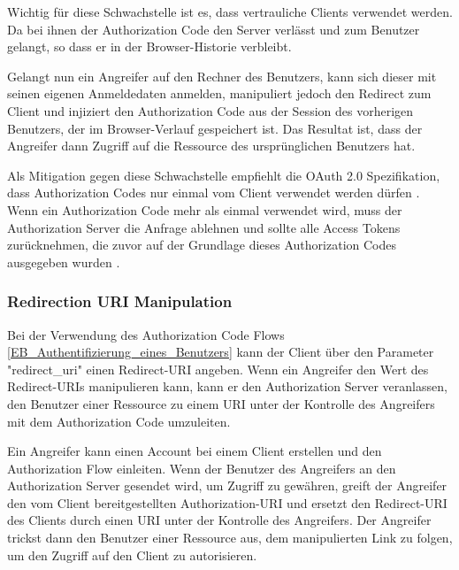 
Wichtig für diese Schwachstelle ist es, dass vertrauliche Clients verwendet werden. Da bei ihnen der Authorization Code den Server verlässt und zum Benutzer gelangt, so dass er in der Browser-Historie verbleibt.

Gelangt nun ein Angreifer auf den Rechner des Benutzers, kann sich dieser mit seinen eigenen Anmeldedaten anmelden, manipuliert jedoch den Redirect zum Client und injiziert den Authorization Code aus der Session des vorherigen Benutzers, der im Browser-Verlauf gespeichert ist. Das Resultat ist, dass der Angreifer dann Zugriff auf die Ressource des ursprünglichen Benutzers hat.

Als Mitigation gegen diese Schwachstelle empfiehlt die OAuth 2.0 Spezifikation, dass Authorization Codes nur einmal vom Client verwendet werden dürfen \cite{OAuthAuthorizationResponse}. Wenn ein Authorization Code mehr als einmal verwendet wird, muss der Authorization Server die Anfrage ablehnen und sollte alle Access Tokens zurücknehmen, die zuvor auf der Grundlage dieses Authorization Codes ausgegeben wurden \cite{OAuthAuthorizationResponse}.

\subsubsection{Redirection URI Manipulation}

Bei der Verwendung des Authorization Code Flows \ref{EB_Authentifizierung_eines_Benutzers} kann der Client über den Parameter "redirect\_uri" einen Redirect-URI angeben. Wenn ein Angreifer den Wert des Redirect-URIs manipulieren kann, kann er den Authorization Server veranlassen, den Benutzer einer Ressource zu einem URI unter der Kontrolle des Angreifers mit dem Authorization Code umzuleiten. \cite{OAuthAuthorizationSecurityConsiderations}

Ein Angreifer kann einen Account bei einem Client erstellen und den Authorization Flow einleiten. Wenn der Benutzer des Angreifers an den Authorization Server gesendet wird, um Zugriff zu gewähren, greift der Angreifer den vom Client bereitgestellten Authorization-URI und ersetzt den Redirect-URI des Clients durch einen URI unter der Kontrolle des Angreifers. Der Angreifer trickst dann den Benutzer einer Ressource aus, dem manipulierten Link zu folgen, um den Zugriff auf den Client zu autorisieren. \cite{OAuthAuthorizationSecurityConsiderations}

